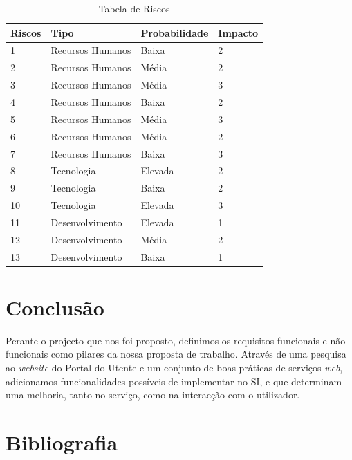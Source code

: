 \documentclass[12pt, a4paper, twoside]{report} %
\begin{document}
\begin{table}[h]
\centering
\begin{tabular}{|l|l l l|}
\hline
Riscos                              & Tipo             & Probabilidade & Impacto \\ \hline
1				                    & Recursos Humanos & Baixa         & 2       \\ \hline
2                               	& Recursos Humanos & Média         & 2       \\ \hline
3                                	& Recursos Humanos & Média         & 3       \\ \hline
4                          			& Recursos Humanos & Baixa         & 2       \\ \hline
5             						& Recursos Humanos & Média         & 3       \\ \hline
6                            		& Recursos Humanos & Média         & 2       \\ \hline
7                     				& Recursos Humanos & Baixa         & 3       \\ \hline
8        							& Tecnologia       & Elevada       & 2       \\ \hline
9 									& Tecnologia       & Baixa         & 2       \\ \hline
10                   				& Tecnologia       & Elevada       & 3       \\ \hline
11              					& Desenvolvimento  & Elevada       & 1       \\ \hline
12 									& Desenvolvimento  & Média         & 2       \\ \hline
13                                	& Desenvolvimento  & Baixa         & 1       \\ \hline
\end{tabular}
\caption{Tabela de Riscos}
\label{riscos}
\end{table}


\chapter{Conclusão}

Perante o projecto que nos foi proposto, definimos os requisitos funcionais e não funcionais como pilares da nossa proposta de trabalho. 
Através de uma pesquisa ao \textit {website} do Portal do Utente e um conjunto de boas práticas de serviços \textit {web}, adicionamos funcionalidades possíveis de implementar no SI, e que determinam uma melhoria, tanto no serviço, como na interacção com o utilizador.


\chapter{Bibliografia}

\end{document}
